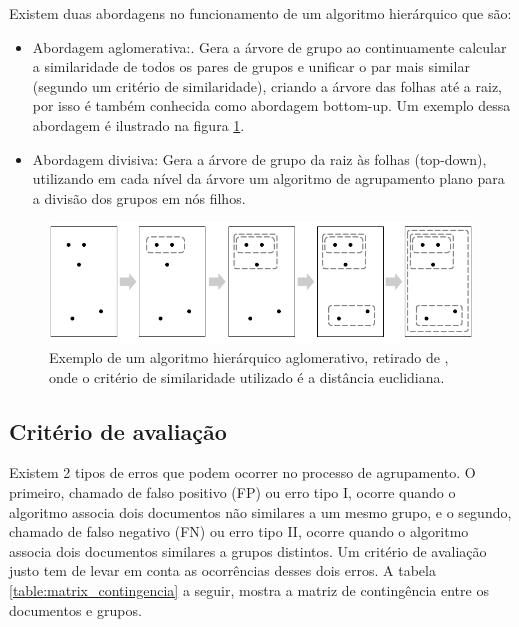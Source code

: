 \documentclass[a4paper,12pt]{article}
\begin{document}
Existem duas abordagens no funcionamento de um algoritmo hierárquico que são:

\begin{itemize}
\item Abordagem aglomerativa:. Gera a árvore de grupo ao continuamente calcular a similaridade de todos os pares de grupos e unificar o par mais similar (segundo um critério de similaridade), criando a árvore das folhas até a raiz, por isso é também conhecida como abordagem bottom-up. Um exemplo dessa abordagem é ilustrado na figura \ref{fig:hierarchical_algorithm}.

\item Abordagem divisiva: Gera a árvore de grupo da raiz às folhas (top-down), utilizando em cada nível da árvore um algoritmo de agrupamento plano para a divisão dos grupos em nós filhos.
\end{itemize}

\begin{figure}[H]
    \begin{center}
        \includegraphics[scale=0.5]{hierarchical_algorithm.png}
    \end{center}
    \caption{Exemplo de um algoritmo hierárquico aglomerativo, retirado de \cite{Segaran08}, onde o critério de similaridade utilizado é a distância euclidiana.}
    \label{fig:hierarchical_algorithm}
\end{figure}

\subsection{Critério de avaliação}
\label{sec:criterio_avaliação}

Existem 2 tipos de erros que podem ocorrer no processo de agrupamento. O primeiro, chamado de falso positivo (FP) ou erro tipo I, ocorre quando o algoritmo associa dois documentos não similares a um mesmo grupo, e o segundo, chamado de falso negativo (FN) ou erro tipo II, ocorre quando o algoritmo associa dois documentos similares a grupos distintos. Um critério de avaliação justo tem de levar em conta as ocorrências desses dois erros. A tabela \ref{table:matrix_contingencia} a seguir, mostra a matriz de contingência entre os documentos e grupos.
\end{document}
